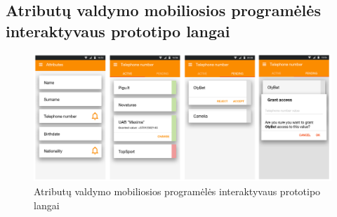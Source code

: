 \begin{landscape}

\section{Atributų valdymo mobiliosios programėlės interaktyvaus prototipo langai} \label{appendix:appSketches}

\begin{figure}[H]
    \centering
    \includegraphics[scale=1]{img/appSketches}
    \caption{Atributų valdymo mobiliosios programėlės interaktyvaus prototipo langai}
    \label{img:appSketches}
\end{figure}

\end{landscape}
